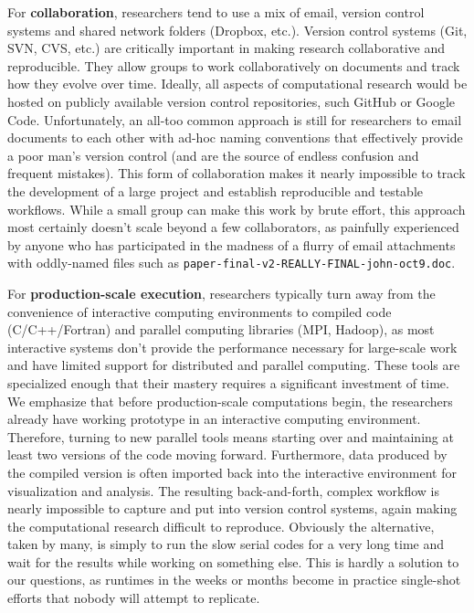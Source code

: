 \documentclass[ChapterTOCs,krantz2]{krantz} %
\begin{document}
For \textbf{collaboration}, researchers tend to use a mix of email, version
control systems and shared network folders (Dropbox, etc.).  Version control
systems (Git, SVN, CVS, etc.) are critically important in making research
collaborative and reproducible. They allow groups to work collaboratively on
documents and track how they evolve over time. Ideally, all aspects of
computational research would be hosted on publicly available version control
repositories, such GitHub or Google Code. Unfortunately, an all-too common
approach is still for researchers to email documents to each other with ad-hoc
naming conventions that effectively provide a poor man's version control (and
are the source of endless confusion and frequent mistakes). This form of
collaboration makes it nearly impossible to track the development of a large
project and establish reproducible and testable workflows.  While a small group
can make this work by brute effort, this approach most certainly doesn't scale
beyond a few collaborators, as painfully experienced by anyone who has
participated in the madness of a flurry of email attachments with oddly-named
files such as {\tt paper-final-v2-REALLY-FINAL-john-oct9.doc}.

For \textbf{production-scale execution}, researchers typically turn away from
the convenience of interactive computing environments to compiled code
(C/C++/Fortran) and parallel computing libraries (MPI, Hadoop), as most
interactive systems don't provide the performance necessary for large-scale
work and have limited support for distributed and parallel computing.  These
tools are specialized enough that their mastery requires a significant
investment of time. We emphasize that before production-scale computations
begin, the researchers already have working prototype in an interactive
computing environment. Therefore, turning to new parallel tools means starting
over and maintaining at least two versions of the code moving
forward. Furthermore, data produced by the compiled version is often imported
back into the interactive environment for visualization and analysis. The
resulting back-and-forth, complex workflow is nearly impossible to capture and
put into version control systems, again making the computational research
difficult to reproduce.  Obviously the alternative, taken by many, is simply to
run the slow serial codes for a very long time and wait for the results while
working on something else.  This is hardly a solution to our questions, as
runtimes in the weeks or months become in practice single-shot efforts that
nobody will attempt to replicate.
\end{document}
